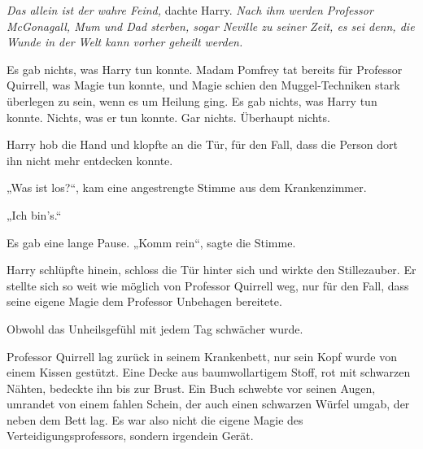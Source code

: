 \emph{Das allein ist der wahre Feind,} dachte Harry. \emph{Nach ihm werden Professor McGonagall, Mum und Dad sterben, sogar Neville zu seiner Zeit, es sei denn, die Wunde in der Welt kann vorher geheilt werden.}

Es gab nichts, was Harry tun konnte. Madam Pomfrey tat bereits für Professor Quirrell, was Magie tun konnte, und Magie schien den Muggel-Techniken stark überlegen zu sein, wenn es um Heilung ging.
Es gab nichts, was Harry tun konnte. Nichts, was er tun konnte. Gar nichts. Überhaupt nichts.

\later

Harry hob die Hand und klopfte an die Tür, für den Fall, dass die Person dort ihn nicht mehr entdecken konnte.

„Was ist los?“, kam eine angestrengte Stimme aus dem Krankenzimmer.

„Ich bin’s.“

Es gab eine lange Pause.
„Komm rein“, sagte die Stimme.

Harry schlüpfte hinein, schloss die Tür hinter sich und wirkte den Stillezauber. Er stellte sich so weit wie möglich von Professor Quirrell weg, nur für den Fall, dass seine eigene Magie dem Professor Unbehagen bereitete.

Obwohl das Unheilsgefühl mit jedem Tag schwächer wurde.

Professor Quirrell lag zurück in seinem Krankenbett, nur sein Kopf wurde von einem Kissen gestützt. Eine Decke aus baumwollartigem Stoff, rot mit schwarzen Nähten, bedeckte ihn bis zur Brust. Ein Buch schwebte vor seinen Augen, umrandet von einem fahlen Schein, der auch einen schwarzen Würfel umgab, der neben dem Bett lag. Es war also nicht die eigene Magie des Verteidigungsprofessors, sondern irgendein Gerät.

